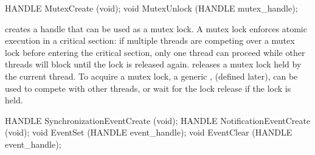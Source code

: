 


\begin{paldef}
HANDLE MutexCreate (void);
void   MutexUnlock (HANDLE mutex_handle);
\end{paldef}


 creates a handle that can be used as a mutex lock.
A mutex lock enforces atomic execution in a critical section:
if multiple threads are competing over a mutex lock
before entering the critical section,
only one thread can proceed while other threads will block until the lock is released again.
 releases a mutex lock held
by the current thread.
To acquire a mutex lock,
a generic \hostapi{},
 (defined later),
can be used to compete with other threads,
or wait for the lock release if the lock is held.



\begin{paldef}
HANDLE SynchronizationEventCreate (void);
HANDLE NotificationEventCreate    (void);
void   EventSet   (HANDLE event_handle);
void   EventClear (HANDLE event_handle);
\end{paldef}






